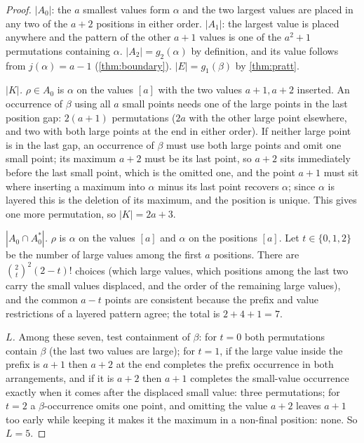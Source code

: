 \documentclass[11pt,reqno]{amsart}
\theoremstyle{plain}
\theoremstyle{definition}
\theoremstyle{remark}
\begin{document}
\begin{proof}
$|A_0|$: the $a$ smallest values form $\alpha$ and the two largest values are placed in any two of the $a+2$ positions in either order. $|A_1|$: the largest value is placed anywhere and the pattern of the other $a+1$ values is one of the $a^2+1$ permutations containing $\alpha$. $|A_2|=g_2(\alpha)$ by definition, and its value follows from $j(\alpha)=a-1$ (\cref{thm:boundary}). $|E|=g_1(\beta)$ by \cref{thm:pratt}.

\emph{$|K|$.}  $\rho\in A_0$ is $\alpha$ on the values $[a]$ with the two values $a+1,a+2$ inserted. An occurrence of $\beta$ using all $a$ small points needs one of the large points in the last position gap: $2(a+1)$ permutations ($2a$ with the other large point elsewhere, and two with both large points at the end in either order). If neither large point is in the last gap, an occurrence of $\beta$ must use both large points and omit one small point; its maximum $a+2$ must be its last point, so $a+2$ sits immediately before the last small point, which is the omitted one, and the point $a+1$ must sit where inserting a maximum into $\alpha$ minus its last point recovers $\alpha$; since $\alpha$ is layered this is the deletion of its maximum, and the position is unique. This gives one more permutation, so $|K|=2a+3$.

\emph{$|A_0\cap A_0^*|$.}  $\rho$ is $\alpha$ on the values $[a]$ and $\alpha$ on the positions $[a]$. Let $t\in\{0,1,2\}$ be the number of large values among the first $a$ positions. There are $\binom2t^2(2-t)!$ choices (which large values, which positions among the last two carry the small values displaced, and the order of the remaining large values), and the common $a-t$ points are consistent because the prefix and value restrictions of a layered pattern agree; the total is $2+4+1=7$.

\emph{$L$.} Among these seven, test containment of $\beta$: for $t=0$ both permutations contain $\beta$ (the last two values are large); for $t=1$, if the large value inside the prefix is $a+1$ then $a+2$ at the end completes the prefix occurrence in both arrangements, and if it is $a+2$ then $a+1$ completes the small-value occurrence exactly when it comes after the displaced small value: three permutations; for $t=2$ a $\beta$-occurrence omits one point, and omitting the value $a+2$ leaves $a+1$ too early while keeping it makes it the maximum in a non-final position: none. So $L=5$.


\end{proof}
\end{document}
